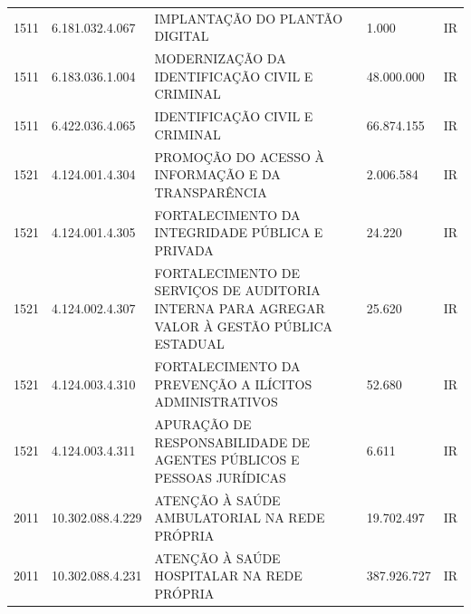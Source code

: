 \documentclass{article}
\begin{document}
\begin{longtable}[c]{m{1cm}|m{2cm}|m{10cm}|m{2cm}|m{1cm}}
\multicolumn{1}{C{1cm}|}{1511} & \multicolumn{1}{C{2cm}|}{6.181.032.4.067} & \multicolumn{1}{L{10cm}|}{IMPLANTAÇÃO DO PLANTÃO DIGITAL} & \multicolumn{1}{R{2cm}|}{1.000} & \multicolumn{1}{C{1cm}}{IR} \\
\multicolumn{1}{C{1cm}|}{1511} & \multicolumn{1}{C{2cm}|}{6.183.036.1.004} & \multicolumn{1}{L{10cm}|}{MODERNIZAÇÃO DA IDENTIFICAÇÃO CIVIL E CRIMINAL} & \multicolumn{1}{R{2cm}|}{48.000.000} & \multicolumn{1}{C{1cm}}{IR} \\
\multicolumn{1}{C{1cm}|}{1511} & \multicolumn{1}{C{2cm}|}{6.422.036.4.065} & \multicolumn{1}{L{10cm}|}{IDENTIFICAÇÃO CIVIL E CRIMINAL} & \multicolumn{1}{R{2cm}|}{66.874.155} & \multicolumn{1}{C{1cm}}{IR} \\
\multicolumn{1}{C{1cm}|}{1521} & \multicolumn{1}{C{2cm}|}{4.124.001.4.304} & \multicolumn{1}{L{10cm}|}{PROMOÇÃO DO ACESSO À INFORMAÇÃO E DA TRANSPARÊNCIA} & \multicolumn{1}{R{2cm}|}{2.006.584} & \multicolumn{1}{C{1cm}}{IR} \\
\multicolumn{1}{C{1cm}|}{1521} & \multicolumn{1}{C{2cm}|}{4.124.001.4.305} & \multicolumn{1}{L{10cm}|}{FORTALECIMENTO DA INTEGRIDADE PÚBLICA E PRIVADA} & \multicolumn{1}{R{2cm}|}{24.220} & \multicolumn{1}{C{1cm}}{IR} \\
\multicolumn{1}{C{1cm}|}{1521} & \multicolumn{1}{C{2cm}|}{4.124.002.4.307} & \multicolumn{1}{L{10cm}|}{FORTALECIMENTO DE SERVIÇOS DE AUDITORIA INTERNA PARA AGREGAR VALOR À GESTÃO PÚBLICA ESTADUAL} & \multicolumn{1}{R{2cm}|}{25.620} & \multicolumn{1}{C{1cm}}{IR} \\
\multicolumn{1}{C{1cm}|}{1521} & \multicolumn{1}{C{2cm}|}{4.124.003.4.310} & \multicolumn{1}{L{10cm}|}{FORTALECIMENTO DA PREVENÇÃO A ILÍCITOS ADMINISTRATIVOS} & \multicolumn{1}{R{2cm}|}{52.680} & \multicolumn{1}{C{1cm}}{IR} \\
\multicolumn{1}{C{1cm}|}{1521} & \multicolumn{1}{C{2cm}|}{4.124.003.4.311} & \multicolumn{1}{L{10cm}|}{APURAÇÃO DE RESPONSABILIDADE DE AGENTES PÚBLICOS E PESSOAS JURÍDICAS} & \multicolumn{1}{R{2cm}|}{6.611} & \multicolumn{1}{C{1cm}}{IR} \\
\multicolumn{1}{C{1cm}|}{2011} & \multicolumn{1}{C{2cm}|}{10.302.088.4.229} & \multicolumn{1}{L{10cm}|}{ATENÇÃO À SAÚDE AMBULATORIAL NA REDE PRÓPRIA} & \multicolumn{1}{R{2cm}|}{19.702.497} & \multicolumn{1}{C{1cm}}{IR} \\
\multicolumn{1}{C{1cm}|}{2011} & \multicolumn{1}{C{2cm}|}{10.302.088.4.231} & \multicolumn{1}{L{10cm}|}{ATENÇÃO À SAÚDE HOSPITALAR NA REDE PRÓPRIA} & \multicolumn{1}{R{2cm}|}{387.926.727} & \multicolumn{1}{C{1cm}}{IR} \\

\end{longtable}
\end{document}
